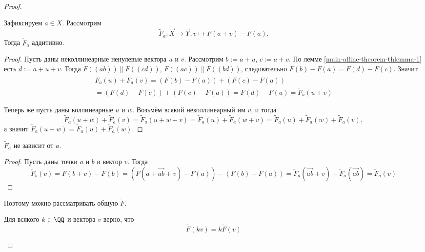 \documentclass[12pt,a4paper]{article}
\begin{document}
\begin{proof}
        \begin{thlemma}
            Зафиксируем $a \in X$. Рассмотрим
            \[\widetilde{F}_a: \overrightarrow{X} \to \overrightarrow{Y}, v \mapsto F(a + v) - F(a).\]
            Тогда $\widetilde{F}_a$ аддитивно.
        \end{thlemma}

        \begin{proof}
            Пусть даны неколлинеарные ненулевые вектора $u$ и $v$. Рассмотрим $b := a + u$, $c := a + v$. По лемме \ref{main-affine-theorem-thlemma-1} есть $d := a + u + v$. Тогда $F((ab)) \parallel F((cd))$, $F((ac)) \parallel F((bd))$, следовательно $F(b) - F(a) = F(d) - F(c)$. Значит
            \begin{multline*}
                    \widetilde{F}_a(u) + \widetilde{F}_a(v)
                    = (F(b) - F(a)) + (F(c) - F(a))\\
                    = (F(d) - F(c)) + (F(c) - F(a))
                    = F(d) - F(a)
                    = \widetilde{F}_a(u + v)
            \end{multline*}

            Теперь же пусть даны коллинеарные $u$ и $w$. Возьмём всякий неколлинеарный им $v$, и тогда
            \[
                \widetilde{F}_a(u+w) + \widetilde{F}_a(v)
                = \widetilde{F}_a(u + w + v)
                = \widetilde{F}_a(u) + \widetilde{F}_a(w + v)
                = \widetilde{F}_a(u) + \widetilde{F}_a(w) + \widetilde{F}_a(v),
            \]
            а значит $\widetilde{F}_a(u + w) = \widetilde{F}_a(u) + \widetilde{F}_a(w)$.
        \end{proof}

        \begin{thlemma}
            $\widetilde{F}_a$ не зависит от $a$.
        \end{thlemma}

        \begin{proof}
            Пусть даны точки $a$ и $b$ и вектор $v$. Тогда
            \[
                \widetilde{F}_b(v) = F(b+v) - F(b)
                = (F(a + \overrightarrow{ab} + v) - F(a)) - (F(b) - F(a))
                = \widetilde{F}_a(\overrightarrow{ab} + v) - \widetilde{F}_a(\overrightarrow{ab})
                = \widetilde{F}_a(v)
            \]
        \end{proof}

        Поэтому можно рассматривать общую $\widetilde{F}$.

        \begin{thlemma}
            Для всякого $k \in \QQ$ и вектора $v$ верно, что
            \[\widetilde{F}(kv) = k \widetilde{F}(v)\]
        \end{thlemma}


\end{proof}
\end{document}
